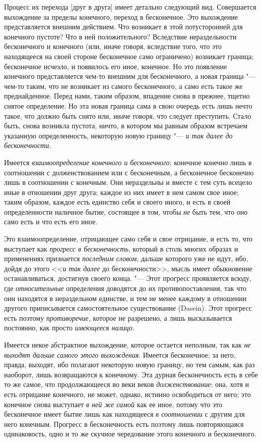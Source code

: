 Процесс их перехода [друг в друга] имеет детально следующий вид. Совершается
выхождение за пределы конечного, переход в бесконечное. Это выхождение
представляется внешним действием. Что возникает в этой потусторонней для
конечного пустоте? Что в ней положительного? Вследствие нераздельности
бесконечного и конечного (или, иначе говоря, вследствие того, что это
находящееся на своей стороне бесконечное само ограничено) возникает
граница; бесконечное исчезло, и появилось его иное, конечное. Но это
появление конечного представляется чем-то внешним для бесконечного, а
новая граница "--- чем-то таким, что не возникает из самого бесконечного, а
само есть такое же преднайденное. Перед нами, таким образом, впадение снова
в прежнее, тщетно снятое определение. Но эта новая граница сама в свою
очередь есть лишь нечто такое, что должно быть снято или, иначе говоря, что
следует преступить. Стало быть, снова возникла пустота, ничто, в котором мы
равным образом встречаем указанную определенность, некоторую новую границу
"--- {\em и так далее до бесконечности}.

Имеется {\em взаимоопределение конечного и
бесконечного}; конечное конечно лишь в соотношении с долженствованием или с
бесконечным, а бесконечное бесконечно лишь в соотношении с конечным. Они
нераздельны и вместе с тем суть всецело иные в отношении друг
друга; каждое из них имеет в нем самом свое иное; таким образом, каждое
есть единство себя и своего иного, и есть в своей определенности наличное
бытие, состоящее в том, чтобы {\em не} быть тем, что
оно само есть и что есть его иное.

Это взаимоопределение, отрицающее само себя и свое отрицание, и есть то, что
выступает как {\em прогресс в бесконечность}, который в
столь многих образах и применениях признается
{\em последним словом}, дальше которого уже не идут,
ибо, дойдя до этого <<{\em и так далее} до
бесконечности>>, мысль имеет обыкновение останавливаться, достигнув своего
конца. "--- Этот прогресс проявляется всюду, где
{\em относительные} определения доводятся до их
противопоставления, так что они находятся в нераздельном единстве, и тем не
менее каждому в отношении другого приписывается самостоятельное
существование (Dasein). Этот прогресс есть поэтому
{\em противоречие}, которое не разрешено, а лишь
высказывается постоянно, как просто {\em имеющееся
налицо}.

Имеется некое абстрактное выхождение, которое остается неполным, так как
{\em не выходят дальше самого этого выхождения}.
Имеется бесконечное; за него, правда, выходят, ибо полагают некоторую новую
границу, но тем самым, как раз наоборот, лишь возвращаются к конечному. Эта
дурная бесконечность есть в себе то же самое, что продолжающееся во веки
веков {\em долженствование}; она, хотя и есть отрицание
конечного, не может, однако, истинно освободиться от него; это конечное
снова выступает {\em в ней же самой} как ее иное,
потому что это бесконечное имеет бытие лишь как находящееся
{\em в соотношении} с другим для него конечным.
Прогресс в бесконечность есть поэтому лишь повторяющаяся одинаковость, одно
и то же скучное чередование этого конечного и бесконечного.

